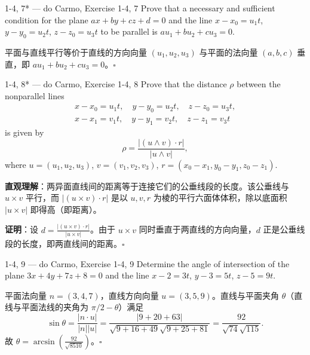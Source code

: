 \begin{exercise}{1-4, 7* — do Carmo, Exercise 1-4, 7}
Prove that a necessary and sufficient condition for the plane $ax + by + cz + d = 0$ and the line $x - x_0 = u_1 t$, $y - y_0 = u_2 t$, $z - z_0 = u_3 t$ to be parallel is $a u_1 + b u_2 + c u_3 = 0$.
\end{exercise}

\begin{solution}
平面与直线平行等价于直线的方向向量 $(u_1,u_2,u_3)$ 与平面的法向量 $(a,b,c)$ 垂直，即 $au_1+bu_2+cu_3 = 0$。$\square$
\end{solution}

\begin{exercise}{1-4, 8* — do Carmo, Exercise 1-4, 8}
Prove that the distance $\rho$ between the nonparallel lines
\[
\begin{array}{l}
x - x_0 = u_1 t, \quad y - y_0 = u_2 t, \quad z - z_0 = u_3 t, \\
x - x_1 = v_1 t, \quad y - y_1 = v_2 t, \quad z - z_1 = v_3 t
\end{array}
\]
is given by
\[
\rho = \frac{|(u \wedge v) \cdot r|}{|u \wedge v|},
\]
where $u = (u_1, u_2, u_3)$, $v = (v_1, v_2, v_3)$, $r = (x_0 - x_1, y_0 - y_1, z_0 - z_1)$.
\end{exercise}

\begin{solution}
\textbf{直观理解}：两异面直线间的距离等于连接它们的公垂线段的长度。该公垂线与 $u\times v$ 平行，而 $|(u\times v)\cdot r|$ 是以 $u,v,r$ 为棱的平行六面体体积，除以底面积 $|u\times v|$ 即得高（即距离）。

\textbf{证明}：设 $d = \frac{|(u\times v)\cdot r|}{|u\times v|}$。由于 $u\times v$ 同时垂直于两直线的方向向量，$d$ 正是公垂线段的长度，即两直线间的距离。$\square$
\end{solution}

\begin{exercise}{1-4, 9 — do Carmo, Exercise 1-4, 9}
Determine the angle of intersection of the plane $3x + 4y + 7z + 8 = 0$ and the line $x - 2 = 3t$, $y - 3 = 5t$, $z - 5 = 9t$.
\end{exercise}

\begin{solution}
平面法向量 $n = (3,4,7)$，直线方向向量 $u = (3,5,9)$。直线与平面夹角 $\theta$（直线与平面法线的夹角为 $\pi/2-\theta$）满足
\[
\sin\theta = \frac{|n \cdot u|}{|n||u|} = \frac{|9+20+63|}{\sqrt{9+16+49}\sqrt{9+25+81}} = \frac{92}{\sqrt{74}\sqrt{115}}.
\]
故 $\theta = \arcsin\left(\frac{92}{\sqrt{8510}}\right)$。$\square$
\end{solution}


